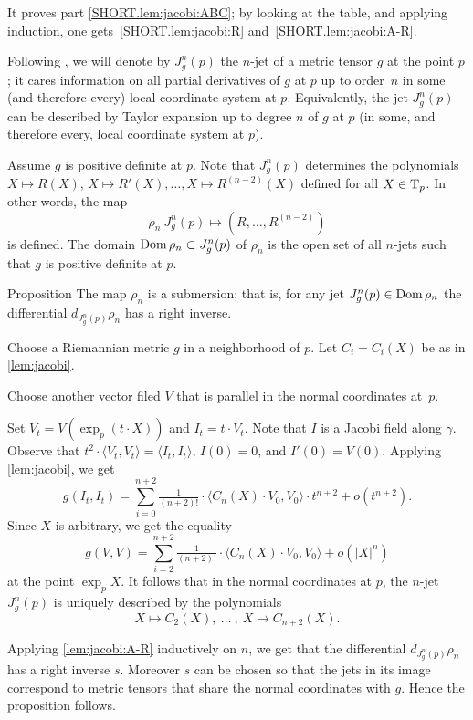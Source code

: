 \documentclass[a4paper,10pt]{article}
\begin{document}
It proves part \ref{SHORT.lem:jacobi:ABC};
by looking at the table, and applying induction, one gets~\ref{SHORT.lem:jacobi:R} and~\ref{SHORT.lem:jacobi:A-R}.\qeds

Following \cite{eliashberg-mishachev}, we will denote by $J^n_g(p)$ the $n$-jet of a metric tensor $g$ at the point $p$;
it cares information on all partial derivatives of $g$ at $p$ up to order~$n$ in some (and therefore every) local coordinate system at $p$.
Equivalently, the jet $J^n_g(p)$ can be described by Taylor expansion up to degree $n$ of $g$ at $p$ (in some, and therefore every, local coordinate system at $p$).

Assume $g$ is positive definite at $p$.
Note that $J^n_g(p)$ determines the polynomials 
$X\mapsto R(X)$, $X\mapsto R'(X),\dots, X\mapsto R^{(n-2)}(X)$ defined for all $X\in \mathrm{T}_p$. 
In other words, the map 
\[\rho_n\:J^n_g(p)\mapsto (R,\dots,R^{(n-2)})\]
is defined.
The domain $\mathop{\rm Dom}\nolimits \rho_n\subset J^n_g(p)$ of $\rho_n$ is the open set of all $n$-jets such that $g$ is positive definite at $p$.

\begin{thm}{Proposition}\label{prop:submersion}
The map $\rho_n$ is a submersion;
that is, for any jet $J^n_g(p)\z\in \Dom \rho_n$ the differential $d_{J^n_g(p)}\rho_n$ has a right inverse.
\end{thm}

Choose a Riemannian metric $g$ in a neighborhood of $p$.
Let $C_i=C_i(X)$ be as in \ref{lem:jacobi}.

Choose another vector filed $V$ that is parallel in the normal coordinates at~$p$.

Set $V_t=V(\exp_p(t\cdot X))$ and $I_t=t\cdot V_t$.
Note that $I$ is a Jacobi field along $\gamma$.
Observe that $t^2\cdot \langle V_t, V_t\rangle=\langle I_t, I_t\rangle$, $I(0)=0$, and $I'(0)=V(0)$.
Applying \ref{lem:jacobi}, we get
\[g(I_t, I_t)=\sum_{i=0}^{n+2}\tfrac1{(n+2)!}\cdot\langle C_n(X)\cdot V_0,V_0\rangle\cdot t^{n+2}+o(t^{n+2}).\]
Since $X$ is arbitrary, we get the equality
\[g( V, V)=\sum_{i=2}^{n+2}\tfrac1{(n+2)!}\cdot\langle C_n(X)\cdot V_0,V_0\rangle+o(|X|^{n})\]
at the point $\exp_p X$.
It follows that in the normal coordinates at $p$,
the $n$-jet $J^n_g(p)$ is uniquely described by the polynomials
\[X\mapsto C_2(X),
\ \dots\ ,\  
X\mapsto C_{n+2}(X).\]

Applying \ref{lem:jacobi:A-R} inductively on $n$, we get that the differential 
$d_{J^n_g(p)}\rho_n$ has a right inverse $s$.
Moreover $s$ can be chosen so that the jets in its image correspond to metric tensors that share the normal coordinates with $g$.
Hence the proposition follows.
\qeds 
\end{document}
